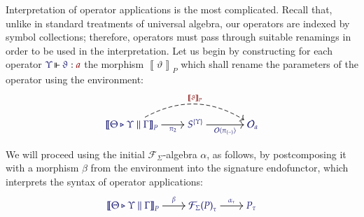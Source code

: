 \documentclass[11pt]{article}
\theoremstyle{definition}
\theoremstyle{remark}
\numberwithin{equation}{section}
\def\IModeColorName{MidnightBlue}
\def\OModeColorName{Maroon}
\newcommand\IMode[1]{{\color{\IModeColorName}{#1}}}
\newcommand\OMode[1]{{\color{\OModeColorName}{#1}}}
\newcommand\Operators{\mathcal{O}}
\newcommand\IsOperator[3]{
  \IMode{#1}\,{\Vdash}\,\IMode{#2}: \OMode{#3}
}
\newcommand\FLift[2]{
  \Operators\langle#1%
  \ifthenelse{\equal{#2}{}}{}{, #2}\rangle%
}
\newcommand\SigFun[1]{\mathcal{F}_{#1}}
\newcommand\SemBrackets[1]{\left\llbracket#1\right\rrbracket}
\begin{document}
Interpretation of operator applications is the most complicated. Recall that,
unlike in standard treatments of universal algebra, our operators are indexed by
symbol collections; therefore, operators must pass through suitable renamings in
order to be used in the interpretation. Let us begin by constructing for each
operator $\IsOperator{\Upsilon}{\vartheta}{a}$ the morphism
$\SemBrackets{\vartheta}_P$ which shall rename the parameters of the operator
using the environment:
\[
  \begin{tikzcd}[cramped, ampersand replacement = \&]
    |[alias = Src]|
    {\IMode{
      {\SemBrackets{
        \Theta\triangleright\Upsilon\parallel\Gamma
      }}_{P}
    }}
      \arrow[
        , r
        , swap
        , "\IMode{\pi_2}"
      ]
\&
    {\IMode{S^{\{\Upsilon\}}}}
      \arrow[
        , r
        , swap
        , "\IMode{\FLift{\pi_{(-)}}{}}"
      ]
\&[1.5em]
    |[alias = Tgt]|
    {\IMode{\Operators_a}}
      \arrow[
        , from = Src
        , to = Tgt
        , bend left
        , dashed
        , "\OMode{\SemBrackets{\vartheta}_{P}}"
      ]
  \end{tikzcd}
\]

We will proceed using the initial $\SigFun{\Sigma}$-algebra $\alpha$, as
follows, by postcomposing it with a morphism $\beta$ from the environment into
the signature endofunctor, which interprets the syntax of operator applications:
\[
  \begin{tikzcd}[cramped, ampersand replacement = \&]
    {\IMode{
      {\SemBrackets{\Theta\triangleright\Upsilon\parallel\Gamma}}_{P}
    }}
      \arrow[r, "\IMode{\beta}"]
\&
    {\IMode{
      {\SigFun{\Sigma}(P)}_{\tau}
    }}
      \arrow[r, "\IMode{\alpha_\tau}"]
\&
    {\IMode{P_\tau}}
  \end{tikzcd}
\]
\end{document}
